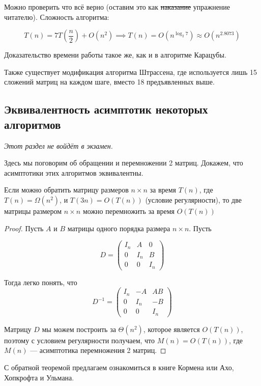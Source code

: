 \documentclass[a4paper, 12pt]{article}
\begin{document}
Можно проверить что всё верно (оставим это как \sout{наказание} упражнение читателю). Сложность алгоритма:

\[T(n) = 7T\left( \frac{n}{2} \right) + O(n^2) \implies T(n) = O\left(n^{\log_{2} 7} \right) \approx O(n^{2.8073})\]

Доказательство времени работы такое же, как и в алгоритме Карацубы.

Также существует модификация алгоритма Штрассена, где используется лишь 15
сложений матриц на каждом шаге, вместо 18 предъявленных выше.

\subsection{Эквивалентность асимптотик некоторых алгоритмов}

\emph{Этот раздел не войдёт в экзамен.}

Здесь мы поговорим об обращении и перемножении 2 матриц. Докажем, что асимптотики
этих алгоритмов эквивалентны.

\begin{Theorem}
  Если можно обратить матрицу размеров $n \times n$ за время $T(n)$,
  где $T(n) = \Omega(n^2)$, и $T(3n) = O(T(n))$ (условие регулярности), то две
  матрицы размером $n \times n$ можно перемножить за время $O(T(n))$
\end{Theorem}

\begin{proof}
  Пусть $A$ и $B$ матрицы одного порядка размера $n \times n$. Пусть

  \[D = 
  \begin{pmatrix}
      I_n & A & 0\\
      0 & I_n & B\\
      0 & 0 & I_n
  \end{pmatrix}\]

  Тогда легко понять, что
  \[
    D^{-1} =
    \begin{pmatrix}
      I_n & -A & AB\\
      0 & I_n & -B \\
      0 & 0 & I_n
    \end{pmatrix}
  \]

  Матрицу $D$ мы можем построить за $\Theta(n^2)$, которое является $O(T(n))$,
  поэтому с условием регулярности получаем, что $M(n) = O(T(n))$, где $M(n)$ ---
  асимптотика перемножения 2 матриц.
\end{proof}

С обратной теоремой предлагаем ознакомиться в книге Кормена или Ахо, Хопкрофта и Ульмана.
\end{document}
